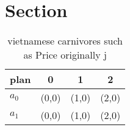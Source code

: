 \documentclass[a4paper]{article}
\begin{document}
\section{Section}

\begin{table}
\begin{adjustbox}{width=0.5\columnwidth}
\begin{tabular}{|l|l|l|l|}
\hline
\textbf{plan} & \multicolumn{1}{c|}{\textbf{0}} & \multicolumn{1}{c|}{\textbf{1}} & \multicolumn{1}{c|}{\textbf{2}} \\ \hline
\textbf{$a_0$}  & (0,0) & (1,0) & (2,0) \\ \hline
\textbf{$a_1$}  & (0,0) & (1,0) & (2,0) \\ \hline
\end{tabular}
\end{adjustbox}
\caption{ vietnamese carnivores such as Price originally j
}
\end{table}
\end{document}
